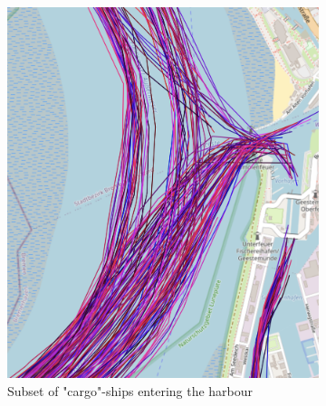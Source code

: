 \begin{figure}[H]
     \centering
     \begin{subfigure}[b]{0.48\textwidth}
         \centering
        \includegraphics[width=\textwidth]{images/ais/tracks/cargo_entering_fary.png}
         \caption{Subset of "cargo"-ships entering the harbour}
     \end{subfigure}
     \hfill
     \begin{subfigure}[b]{0.48\textwidth}
         \centering

\end{subfigure}
\end{figure}
